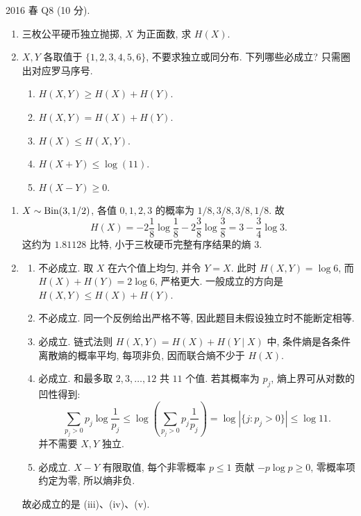 \begin{exercise}\label{ex:fe2016q8}
2016 春 Q8 (10 分).
\begin{enumerate}[label=(\alph*)]
\item\label{ex:fe2016q8-a} 三枚公平硬币独立抛掷, $X$ 为正面数, 求 $H(X)$.
\item $X,Y$ 各取值于 $\{1,2,3,4,5,6\}$, 不要求独立或同分布. 下列哪些必成立? 只需圈出对应罗马序号.
\begin{enumerate}[label=(\roman*)]
\item\label{ex:fe2016q8-b-i} $H(X,Y)\ge H(X)+H(Y)$.
\item\label{ex:fe2016q8-b-ii} $H(X,Y)=H(X)+H(Y)$.
\item\label{ex:fe2016q8-b-iii} $H(X)\le H(X,Y)$.
\item\label{ex:fe2016q8-b-iv} $H(X+Y)\le\log(11)$.
\item\label{ex:fe2016q8-b-v} $H(X-Y)\ge0$.
\end{enumerate}
\end{enumerate}
\end{exercise}
\begin{solution}
\begin{enumerate}[label=(\alph*)]
\item\label{sol:fe2016q8-a} $X\sim\operatorname{Bin}(3,1/2)$, 各值 $0,1,2,3$ 的概率为 $1/8,3/8,3/8,1/8$. 故
\[
 H(X)=-2\frac18\log\frac18-2\frac38\log\frac38
 =3-\frac34\log3.
\]
这约为 $1.81128$ 比特, 小于三枚硬币完整有序结果的熵 $3$.
\item
\begin{enumerate}[label=(\roman*)]
\item\label{sol:fe2016q8-b-i} 不必成立. 取 $X$ 在六个值上均匀, 并令 $Y=X$. 此时 $H(X,Y)=\log6$, 而 $H(X)+H(Y)=2\log6$, 严格更大. 一般成立的方向是 $H(X,Y)\le H(X)+H(Y)$.
\item\label{sol:fe2016q8-b-ii} 不必成立. 同一个反例给出严格不等, 因此题目未假设独立时不能断定相等.
\item\label{sol:fe2016q8-b-iii} 必成立. 链式法则 $H(X,Y)=H(X)+H(Y\mid X)$ 中, 条件熵是各条件离散熵的概率平均, 每项非负, 因而联合熵不少于 $H(X)$.
\item\label{sol:fe2016q8-b-iv} 必成立. 和最多取 $2,3,\ldots,12$ 共 $11$ 个值. 若其概率为 $p_j$, 熵上界可从对数的凹性得到:
\[
 \sum_{p_j>0}p_j\log\frac1{p_j}
 \le\log\left(\sum_{p_j>0}p_j\frac1{p_j}\right)
 =\log|\{j:p_j>0\}|\le\log11.
\]
并不需要 $X,Y$ 独立.
\item\label{sol:fe2016q8-b-v} 必成立. $X-Y$ 有限取值, 每个非零概率 $p\le1$ 贡献 $-p\log p\ge0$, 零概率项约定为零, 所以熵非负.
\end{enumerate}
故必成立的是 (iii)、(iv)、(v).
\end{enumerate}
\end{solution}

